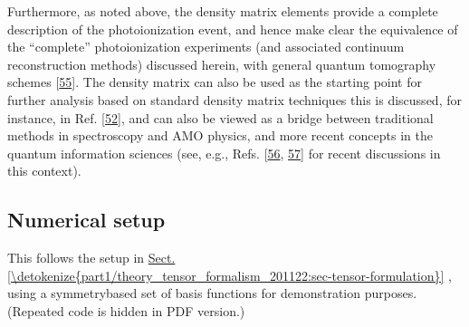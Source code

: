 \documentclass[letterpaper,table,10pt,english]{jupyterBook}
\begin{document}
\sphinxAtStartPar
Furthermore, as noted above, the density matrix elements provide a complete description of the photoionization event, and hence make clear the equivalence of the “complete” photoionization experiments (and associated continuum reconstruction methods) discussed herein, with general quantum tomography schemes {[}\hyperlink{cite.backmatter/bibliography:id654}{55}{]}. The density matrix can also be used as the starting point for further analysis based on standard density matrix techniques \sphinxhyphen{} this is discussed, for instance, in Ref. {[}\hyperlink{cite.backmatter/bibliography:id444}{52}{]}, and can also be viewed as a bridge between traditional methods in spectroscopy and AMO physics, and more recent concepts in the quantum information sciences (see, e.g., Refs. {[}\hyperlink{cite.backmatter/bibliography:id770}{56}, \hyperlink{cite.backmatter/bibliography:id820}{57}{]} for recent discussions in this context).


\subsection{Numerical setup}
\label{\detokenize{part1/theory_density_matrices_310123:numerical-setup}}
\sphinxAtStartPar
This follows the setup in \hyperref[\detokenize{part1/theory_tensor_formalism_201122:sec-tensor-formulation}]{Sect.\@ \ref{\detokenize{part1/theory_tensor_formalism_201122:sec-tensor-formulation}}} {\hyperref[\detokenize{part1/theory_tensor_formalism_201122:sec-tensor-formulation}]{}}, using a symmetry\sphinxhyphen{}based set of basis functions for demonstration purposes. (Repeated code is hidden in PDF version.)
\end{document}
